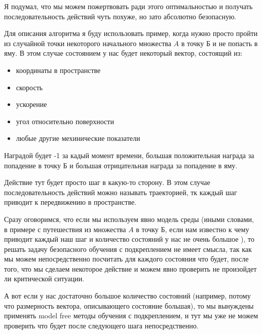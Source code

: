\documentclass[a4paper]{article}
\begin{document}
Я подумал, что мы можем пожертвовать ради этого оптимальностью и получать последовательность действий чуть похуже, но зато абсолютно безопасную.

Для описания алгоритма я буду использовать пример, когда нужно просто пройти из случайной точки некоторого начального множества $A$ в точку Б и не попасть в яму. В этом случае состоянием у нас будет некоторый вектор, состоящий из:
\begin{itemize}
\item координаты в пространстве
\item скорость 
\item ускорение
\item угол относительно поверхности 
\item любые другие мехинические показатели 
\end{itemize}
Наградой будет -1 за кадый момент времени, большая положительная награда за попадение в точку Б и большая отрицательная награда за попадение в яму.

Действие тут будет просто шаг в какую-то сторону.
В этом случае последовательность действий можно называть траекторией, тк каждый шаг приводит к передвижению в пространстве.

Сразу оговоримся, что если мы используем явно модель среды (иными словами, в примере с путешествия из множества $A$ в точку Б, если нам известно к чему приводит каждый наш шаг и количество состояний у нас не очень большое ), то решать задачу безопасного обучения с подкреплением не имеет смысла, так как мы можем непосредственно посчитать для каждого состояния что будет, после того, что мы сделаем некоторое действие и можем явно проверить не произойдет ли критической ситуации.

А вот если у нас достаточно большое количество состояний (например, потому что размерность вектора, описывающего состояние большая), то мы вынуждены применять model free методы обучения с подкреплением, и тут мы уже не можем проверить что будет после следующего шага непосредственно. 
\end{document}
